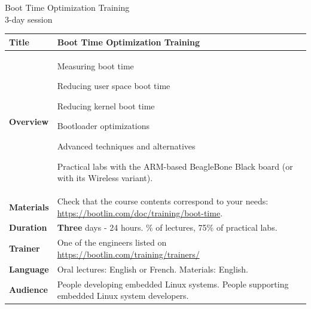\documentclass[a4paper,12pt,obeyspaces,spaces,hyphens]{article}
\begin{document}
\setlength{\arrayrulewidth}{0.8pt}

\begin{center}
\LARGE
Boot Time Optimization Training\\
\large
3-day session
\end{center}
\vspace{1cm}

\small
{}

 {
  \begin{tabularx}{\textwidth}{|g|h|}
    {\bf Title} & {\bf Boot Time Optimization Training}\\
    \hline

    {\bf Overview} &
    Measuring boot time \par
    Reducing user space boot time \par
    Reducing kernel boot time \par
    Bootloader optimizations \par
    Advanced techniques and alternatives \par
    Practical labs with the ARM-based BeagleBone Black board
    (or with its Wireless variant).\\
    \hline
    {\bf Materials} &
    Check that the course contents correspond to your needs:
    \newline \url{https://bootlin.com/doc/training/boot-time}. \\
    \hline

    {\bf Duration} & {\bf Three} days - 24 hours.
    \% of lectures, 75\% of practical labs. \\
    \hline

    {\bf Trainer} & One of the engineers listed on
    \newline \url{https://bootlin.com/training/trainers/}\\
    \hline

    {\bf Language} & Oral lectures: English or French.
    \newline Materials: English.\\
    \hline

    {\bf Audience} & People developing embedded Linux systems.
    \newline People supporting embedded Linux system developers. \\
    \hline


\end{tabularx}}
\end{document}
